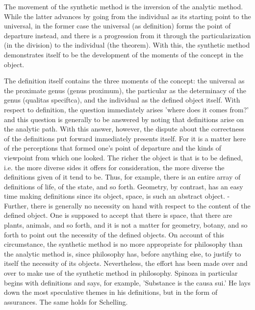     The movement of the synthetic method is the inversion of the analytic method.
    While the latter advances by going from the individual as its starting point
    to the universal, in the former case the universal (as definition) forms the point of
    departure instead, and there is a progression from it through the particularization
    (in the division) to the individual (the theorem). With this, the synthetic method
    demonstrates itself to be the development of the moments of the concept in the
    object.

    The definition itself contains the three moments of the concept:
    the universal as the proximate genus (genus proximum),
    the particular as the determinacy of the genus (qualitas speciftca),
    and the individual as the defined object itself.
    With respect to definition, the question immediately
    arises 'where does it comes from?' and this question is generally to be answered
    by noting that definitions arise on the analytic path.
    With this answer, however, the dispute about the correctness of the definitions put forward immediately
    presents itself. For it is a matter here of rhe perceptions that formed one's point
    of departure and the kinds of viewpoint from which one looked. The richer the
    object is that is to be defined, i.e. the more diverse sides it offers for
    consideration, the more diverse the definitions given of it tend to be. Thus, for
    example, there is an entire array of definitions of life, of the state, and so forth.
    Geometry, by contrast, has an easy time making definitions since its object, space,
    is such an abstract object. - Further, there is generally no necessity
    on hand with respect to the content of the defined object.
    One is supposed to accept that there is space, that there are plants, animals, and so
    forth, and it is not a matter for geometry, botany, and so forth to point out the
    necessity of the defined objects. On account of this circumstance, the
    synthetic method is no more appropriate for philosophy than the analytic method
    is, since philosophy has, before anything else, to justify to itself the necessity of
    its objects. Nevertheless, the effort has been made over and over
    to make use of the synthetic method in philosophy. Spinoza in particular begins
    with definitions and says, for example, 'Substance is the causa sui.' He lays down
    the most speculative themes in his definitions, but in the form of assurances.
    The same holds for Schelling.

